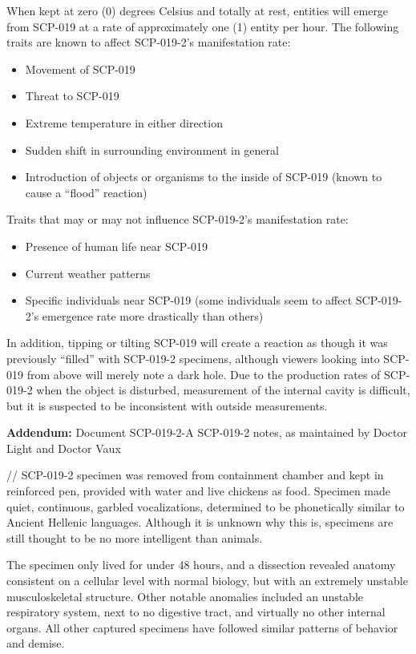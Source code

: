When kept at zero (0) degrees Celsius and totally at rest, entities will emerge from SCP-019 at a rate of approximately one (1) entity per hour. The following traits are known to affect SCP-019-2's manifestation rate:
\begin{itemize}
\renewcommand{\labelitemi}{$\ast$}
\item Movement of SCP-019
\item Threat to SCP-019
\item Extreme temperature in either direction
\item Sudden shift in surrounding environment in general
\item Introduction of objects or organisms to the inside of SCP-019 (known to cause a “flood” reaction)
\end{itemize}
Traits that may or may not influence SCP-019-2's manifestation rate:
\begin{itemize}
\renewcommand{\labelitemi}{$\ast$}
\item Presence of human life near SCP-019
\item Current weather patterns
\item Specific individuals near SCP-019 (some individuals seem to affect SCP-019-2's emergence rate more drastically than others)
\end{itemize}
In addition, tipping or tilting SCP-019 will create a reaction as though it was previously “filled” with SCP-019-2 specimens, although viewers looking into SCP-019 from above will merely note a dark hole. Due to the production rates of SCP-019-2 when the object is disturbed, measurement of the internal cavity is difficult, but it is suspected to be inconsistent with outside measurements.

\textbf{Addendum:} Document SCP-019-2-A
SCP-019-2 notes, as maintained by Doctor Light and Doctor Vaux

//\linebreak
SCP-019-2 specimen was removed from containment chamber and kept in reinforced pen, provided with water and live chickens as food. Specimen made quiet, continuous, garbled vocalizations, determined to be phonetically similar to Ancient Hellenic languages. Although it is unknown why this is, specimens are still thought to be no more intelligent than animals.

The specimen only lived for under 48 hours, and a dissection revealed anatomy consistent on a cellular level with normal biology, but with an extremely unstable musculoskeletal structure. Other notable anomalies included an unstable respiratory system, next to no digestive tract, and virtually no other internal organs. All other captured specimens have followed similar patterns of behavior and demise.

